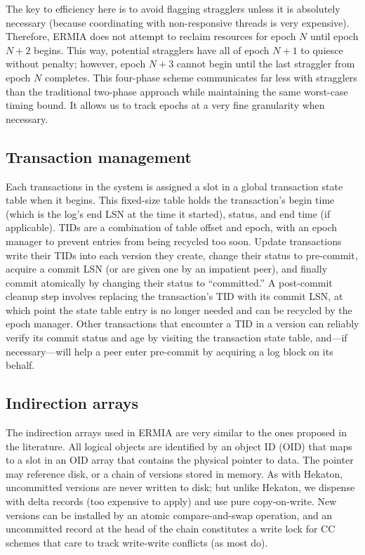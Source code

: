 The key to efficiency here is to avoid flagging stragglers unless it is absolutely necessary (because coordinating with non-responsive threads is very expensive). Therefore, ERMIA does not attempt to reclaim resources for epoch $N$ until epoch $N+2$ begins. This way, potential stragglers have all of epoch $N+1$ to quiesce without penalty; however, epoch $N+3$ cannot begin until the last straggler from epoch $N$ completes. This four-phase scheme communicates far less with stragglers than the traditional two-phase  approach while maintaining the same worst-case timing bound. It allows us to track epochs at a very fine granularity when necessary. 


\subsection{Transaction management}
Each transactions in the system is assigned a slot in a global transaction state table when it begins. This fixed-size table holds the transaction's begin time (which is the log's end LSN at the time it started), status, and end time (if applicable). TIDs are a combination of table offset and epoch, with an epoch manager to prevent entries from being recycled too soon. Update transactions write their TIDs into each version they create, change their status to pre-commit, acquire a commit LSN (or are given one by an impatient peer), and finally commit atomically by changing their status to ``committed.'' A post-commit cleanup step involves replacing the transaction's TID with its commit LSN, at which point the state table entry is no longer needed and can be recycled by the epoch manager. Other transactions that encounter a TID in a version can reliably verify its commit status and age by visiting the transaction state table, and---if necessary---will help a peer enter pre-commit by acquiring a log block on its behalf. 

\subsection{Indirection arrays}

The indirection arrays used in ERMIA are very similar to the ones proposed in the literature. All logical objects are identified by an object ID (OID) that maps to a slot in an OID array that contains the physical pointer to data. The pointer may reference disk, or a chain of versions stored in memory. As with Hekaton, uncommitted versions are never written to disk; but unlike Hekaton, we dispense with delta records (too expensive to apply) and use pure copy-on-write. New versions can be installed by an atomic compare-and-swap operation, and an uncommitted record at the head of the chain constitutes a write lock for CC schemes that care to track write-write conflicts (as most do). 

